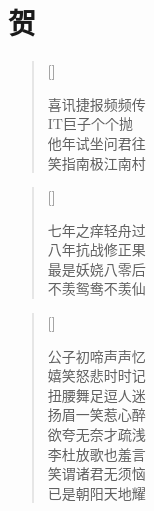 \chapter{贺}
\thispagestyle{empty}
\renewcommand{\poemtoc}{section}
\settowidth{\versewidth}{喜讯捷报频频传}
\begin{verse}[\versewidth]

喜讯捷报频频传\\
IT巨子个个抛\\
他年试坐问君往\\
笑指南极江南村
\end{verse}

\renewcommand{\poemtoc}{section}
\settowidth{\versewidth}{七年之痒轻舟过}
\begin{verse}[\versewidth]

七年之痒轻舟过\\
八年抗战修正果\\
最是妖娆八零后\\
不羡鸳鸯不羡仙\\
\end{verse}

\renewcommand{\poemtoc}{section}
\settowidth{\versewidth}{公子初啼声声忆}
\begin{verse}[\versewidth]

公子初啼声声忆\\
嬉笑怒悲时时记\\
扭腰舞足逗人迷\\
扬眉一笑惹心醉\\
欲夸无奈才疏浅\\
李杜放歌也羞言\\
笑谓诸君无须恼\\
已是朝阳天地耀\\
\end{verse}

